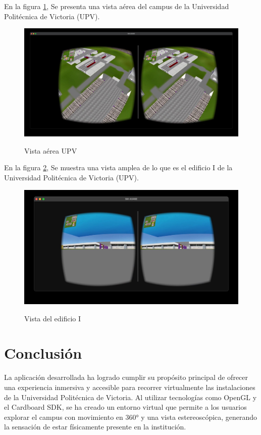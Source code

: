 \documentclass[conference]{IEEEtran}
\begin{document}
En la figura \ref{fig:e4}, Se presenta una vista aérea del campus de la Universidad Politécnica de Victoria (UPV).
\begin{figure}[h]
    \centering
        {\includegraphics[width=0.8\columnwidth]{Capturas/img4.jpeg}}
        \caption{Vista aérea UPV}
        \label{fig:e4}
\end{figure}

En la figura \ref{fig:e5}, Se muestra una vista amplea de lo que es el edificio I de la Universidad Politécnica de Victoria (UPV).

\begin{figure}
    \centering
    {\includegraphics[width=0.8\columnwidth]{Capturas/img5.jpg}}
        \caption{Vista del edificio I}
        \label{fig:e5}
\end{figure}

\newpage

\section{Conclusión}
La aplicación desarrollada ha logrado cumplir su propósito principal de ofrecer una experiencia inmersiva y accesible para recorrer virtualmente \cite{Sh:10} las instalaciones de la Universidad Politécnica de Victoria. Al utilizar tecnologías como OpenGL \cite{Sh:4} y el Cardboard SDK, se ha creado un entorno virtual que permite a los usuarios explorar el campus con movimiento en 360° y una vista estereoscópica, generando la sensación de estar físicamente presente en la institución.
\end{document}

